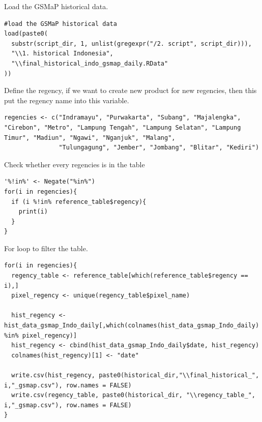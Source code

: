 \documentclass[12pt, a4paper]{article}
\begin{document}
\vskip 0.5cm
\noindent
Load the GSMaP historical data.
\begin{lstlisting}
#load the GSMaP historical data
load(paste0(
  substr(script_dir, 1, unlist(gregexpr("/2. script", script_dir))),
  "\\1. historical Indonesia",
  "\\final_historical_indo_gsmap_daily.RData"
))
\end{lstlisting}


\newpage


\vskip 0.5cm
\noindent
Define the regency, if we want to create new product for new regencies, then this put the regency name into this variable.
\begin{lstlisting}
regencies <- c("Indramayu", "Purwakarta", "Subang", "Majalengka", "Cirebon", "Metro", "Lampung Tengah", "Lampung Selatan", "Lampung Timur", "Madiun", "Ngawi", "Nganjuk", "Malang",
               "Tulungagung", "Jember", "Jombang", "Blitar", "Kediri")
\end{lstlisting}

\vskip 0.5cm
\noindent
Check whether every regencies is in the table
\begin{lstlisting}
'%!in%' <- Negate("%in%")
for(i in regencies){
  if (i %!in% reference_table$regency){
    print(i)
  }
}
\end{lstlisting}

\vskip 0.5cm
\noindent
For loop to filter the table.
\begin{lstlisting}
for(i in regencies){
  regency_table <- reference_table[which(reference_table$regency == i),]
  pixel_regency <- unique(regency_table$pixel_name)
  
  hist_regency <- hist_data_gsmap_Indo_daily[,which(colnames(hist_data_gsmap_Indo_daily) %in% pixel_regency)]
  hist_regency <- cbind(hist_data_gsmap_Indo_daily$date, hist_regency)
  colnames(hist_regency)[1] <- "date"
  
  write.csv(hist_regency, paste0(historical_dir,"\\final_historical_", i,"_gsmap.csv"), row.names = FALSE)
  write.csv(regency_table, paste0(historical_dir, "\\regency_table_", i,"_gsmap.csv"), row.names = FALSE)
}
\end{lstlisting}
\end{document}
